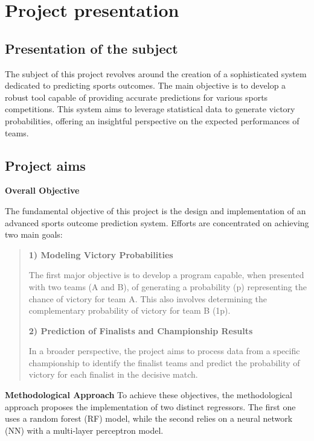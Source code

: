 \chapter{Project presentation}


\section{Presentation of the subject}

The subject of this project revolves around the creation of a sophisticated system dedicated to predicting sports outcomes. The main objective is to develop a robust tool capable of providing accurate predictions for various sports competitions. This system aims to leverage statistical data to generate victory probabilities, offering an insightful perspective on the expected performances of teams.

\section{Project aims}

\textbf{Overall Objective}

The fundamental objective of this project is the design and implementation of an advanced sports outcome prediction system. Efforts are concentrated on achieving two main goals:

\begin{quote}
\textbf{1) Modeling Victory Probabilities}

The first major objective is to develop a program capable, when presented with two teams (A and B), of generating a probability (p) representing the chance of victory for team A. This also involves determining the complementary probability of victory for team B (1\-p).



\textbf{2) Prediction of Finalists and Championship Results}

In a broader perspective, the project aims to process data from a specific championship to identify the finalist teams and predict the probability of victory for each finalist in the decisive match.
\end{quote}

\textbf{Methodological Approach}
To achieve these objectives, the methodological approach proposes the implementation of two distinct regressors. The first one uses a random forest (RF) model, while the second relies on a neural network (NN) with a multi-layer perceptron model.

